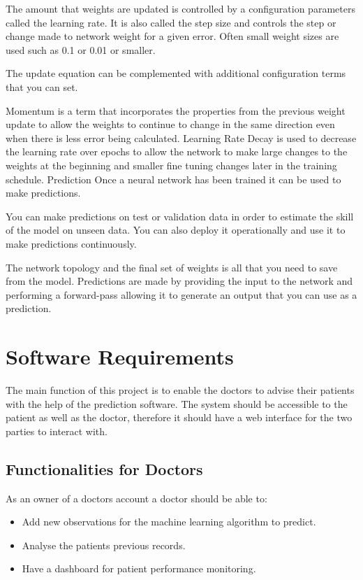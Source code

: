 \documentclass[12pt]{article}
\begin{document}
The amount that weights are updated is controlled by a configuration parameters called the learning rate. It is also called the step size and controls the step or change made to network weight for a given error. Often small weight sizes are used such as 0.1 or 0.01 or smaller.

The update equation can be complemented with additional configuration terms that you can set.

Momentum is a term that incorporates the properties from the previous weight update to allow the weights to continue to change in the same direction even when there is less error being calculated.
Learning Rate Decay is used to decrease the learning rate over epochs to allow the network to make large changes to the weights at the beginning and smaller fine tuning changes later in the training schedule.
Prediction
Once a neural network has been trained it can be used to make predictions.

You can make predictions on test or validation data in order to estimate the skill of the model on unseen data. You can also deploy it operationally and use it to make predictions continuously.

The network topology and the final set of weights is all that you need to save from the model. Predictions are made by providing the input to the network and performing a forward-pass allowing it to generate an output that you can use as a prediction.





\newpage
\section{Software Requirements}
The main function of this project is to enable the doctors to advise their patients with the help of the prediction software. The system should be accessible to the patient as well as the doctor, therefore it should have a web interface for the two parties to interact with.

\subsection{Functionalities for Doctors}
As an owner of a doctors account a doctor should be able to:
\begin{itemize}
\item Add new observations for the machine learning algorithm to predict.
\item Analyse the patients previous records.
\item Have a dashboard for patient performance monitoring.
\end{itemize}
\end{document}
